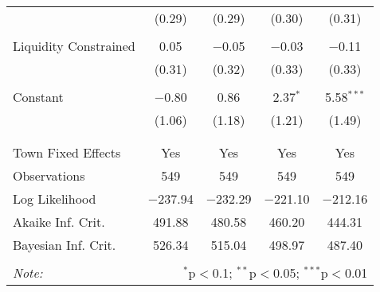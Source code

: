 \begin{table}[H]
\begin{tabular}{@{\extracolsep{5pt}}lcccc}
  & (0.29) & (0.29) & (0.30) & (0.31) \\ 
  & & & & \\ 
 Liquidity Constrained & 0.05 & $-$0.05 & $-$0.03 & $-$0.11 \\ 
  & (0.31) & (0.32) & (0.33) & (0.33) \\ 
  & & & & \\ 
 Constant & $-$0.80 & 0.86 & 2.37$^{*}$ & 5.58$^{***}$ \\ 
  & (1.06) & (1.18) & (1.21) & (1.49) \\ 
  & & & & \\ 
\hline \\[-1.8ex] 
Town Fixed Effects & Yes & Yes & Yes & Yes \\ 
Observations & 549 & 549 & 549 & 549 \\ 
Log Likelihood & $-$237.94 & $-$232.29 & $-$221.10 & $-$212.16 \\ 
Akaike Inf. Crit. & 491.88 & 480.58 & 460.20 & 444.31 \\ 
Bayesian Inf. Crit. & 526.34 & 515.04 & 498.97 & 487.40 \\ 
\hline 
\hline \\[-1.8ex]
\textit{Note:}  & \multicolumn{4}{r}{$^{*}$p$<$0.1; $^{**}$p$<$0.05; $^{***}$p$<$0.01} \\ 
\end{tabular} 
\end{table} 

